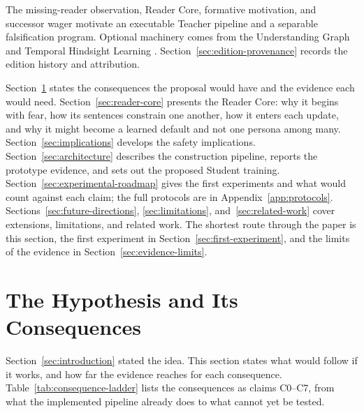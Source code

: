 \documentclass[11pt]{article}
\begin{document}
The missing-reader observation, Reader Core, formative motivation, and
successor wager \cite{westerberg2025superintelligence} motivate an executable
Teacher pipeline and a separable falsification program. Optional machinery
comes from the Understanding Graph and Temporal Hindsight Learning
\cite{westerberg2026understanding,westerberg2026thl}.
Section~\ref{sec:edition-provenance} records the edition history and attribution.

Section~\ref{sec:hypothesis} states the consequences the proposal would have
and the evidence each would need. Section~\ref{sec:reader-core} presents the
Reader Core: why it begins with fear, how its sentences constrain one another,
how it enters each update, and why it might become a learned default and not
one persona among many. Section~\ref{sec:implications} develops the safety
implications. Section~\ref{sec:architecture} describes the construction
pipeline, reports the prototype evidence, and sets out the proposed Student
training. Section~\ref{sec:experimental-roadmap} gives the first experiments
and what would count against each claim; the full protocols are in
Appendix~\ref{app:protocols}. Sections~\ref{sec:future-directions},
\ref{sec:limitations}, and~\ref{sec:related-work} cover extensions,
limitations, and related work. The shortest route through the paper is this
section, the first experiment in Section~\ref{sec:first-experiment}, and the
limits of the evidence in Section~\ref{sec:evidence-limits}.

\section{The Hypothesis and Its Consequences}\label{sec:hypothesis}



Section~\ref{sec:introduction} stated the idea. This section states what would
follow if it works, and how far the evidence reaches for each consequence.
Table~\ref{tab:consequence-ladder} lists the consequences as claims C0--C7,
from what the implemented pipeline already does to what cannot yet be tested.
\end{document}
